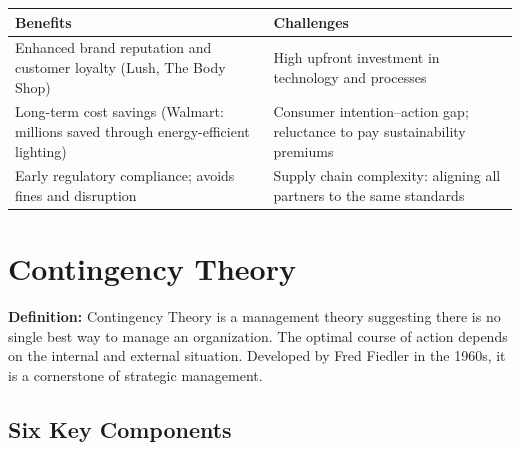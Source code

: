 \documentclass[11pt, letterpaper]{article}
\begin{document}
\begin{center}
\begin{tabular}{p{6.5cm} p{6.5cm}}
\toprule
\textbf{Benefits} & \textbf{Challenges} \\
\midrule
Enhanced brand reputation and customer loyalty (Lush, The Body Shop) & High upfront investment in technology and processes \\
Long-term cost savings (Walmart: millions saved through energy-efficient lighting) & Consumer intention--action gap; reluctance to pay sustainability premiums \\
Early regulatory compliance; avoids fines and disruption & Supply chain complexity: aligning all partners to the same standards \\
\bottomrule
\end{tabular}
\end{center}

\newpage

\section{Contingency Theory}

\begin{defbox}
\textbf{Definition:} Contingency Theory is a management theory suggesting there is no single best way to manage an organization. The optimal course of action depends on the internal and external situation. Developed by Fred Fiedler in the 1960s, it is a cornerstone of strategic management.
\end{defbox}

\subsection{Six Key Components}
\end{document}
